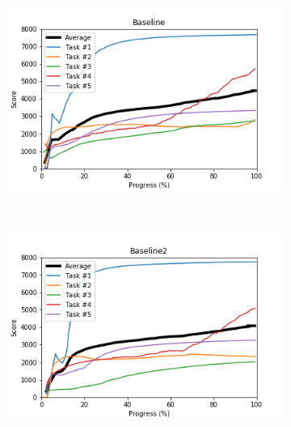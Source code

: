 \documentclass{article} %
\begin{document}
\begin{figure}[!ht]
    \centering
    \begin{subfigure}[t]{0.5\textwidth}
        \centering
        \includegraphics[width=\textwidth]{images/Baseline.png}
    \end{subfigure}%
    ~ 
    \begin{subfigure}[t]{0.5\textwidth}
        \centering
        \includegraphics[width=\textwidth]{images/Baseline2.png}
    \end{subfigure}%


\end{figure}
\end{document}
